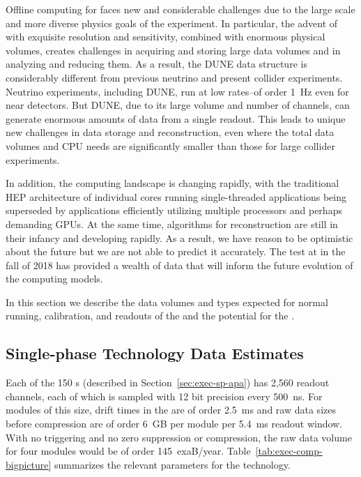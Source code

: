 Offline computing for   faces new and considerable challenges due to the large scale and more diverse physics goals of the experiment.  In particular, the advent of  with exquisite resolution and sensitivity, combined with enormous physical volumes, creates challenges in acquiring and storing large data volumes and in analyzing and reducing them.  
As a result, the DUNE data structure is considerably different from previous neutrino and present collider experiments.  Neutrino experiments, including DUNE, run at low rates--of order \SI{1}{Hz} even for near detectors. But DUNE, due to its large volume and number of channels, can generate enormous amounts of data from a single readout.
This leads to unique new challenges in data storage and reconstruction, even where the total data volumes and CPU needs are significantly smaller than those for large collider experiments.  

In addition, the computing landscape is changing rapidly, with the traditional HEP architecture of individual cores running single-threaded applications being superseded by applications efficiently utilizing multiple processors and perhaps demanding GPUs. At the same time, algorithms for  reconstruction are still in their infancy and developing rapidly.  As a result, we have reason to be optimistic about the future but we are not able to predict it accurately.  The  test at  in the fall of 2018 has provided a wealth of data that will inform the future evolution of  the  computing models.

In this section we describe the data volumes and types expected for normal running, calibration, and  readouts of the  and the potential for the . 


\subsection{Single-phase Technology Data Estimates}
 
Each of the 150  s (described in  Section~\ref{sec:exec-sp-apa}) has 2,560 readout channels, each of which %
is sampled with 12 bit precision every \SI{500}{ns}. 
For modules of this size, drift times in the  are of order \SI{2.5}{ms} and raw data sizes before compression are of order \SI{6}{GB} per module per \SI{5.4}{ms} readout window.  With no triggering and no zero suppression or compression, the raw data volume for four modules would be of order \SI{145}{exaB/year}. Table~\ref{tab:exec-comp-bigpicture} summarizes the relevant parameters for the  technology.


